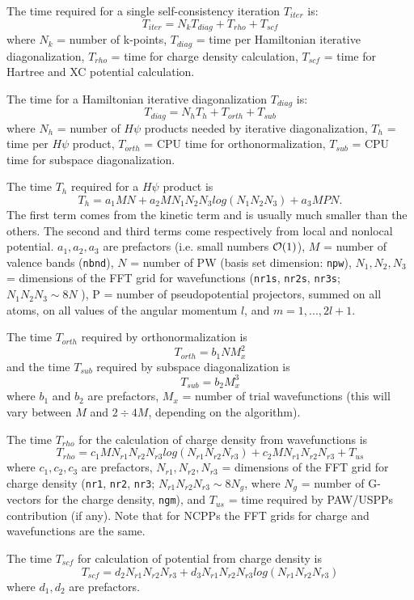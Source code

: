 \documentclass[12pt,a4paper]{article}
\begin{document}
The time required for a single self-consistency iteration $T_{iter}$ is:
$$T_{iter} = N_k T_{diag} +T_{rho} + T_{scf}$$
where $N_k$ = number of k-points, $T_{diag}$ = time per 
Hamiltonian iterative diagonalization, $T_{rho}$ = time for charge density 
calculation, $T_{scf}$ = time for Hartree and XC potential
calculation.
    
The time for a Hamiltonian iterative diagonalization $T_{diag}$ is:
$$T_{diag} = N_h T_h + T_{orth} + T_{sub}$$
where $N_h$ = number of $H\psi$ products needed by iterative diagonalization,
$T_h$ = time per $H\psi$ product, $T_{orth}$ = CPU time for 
orthonormalization, $T_{sub}$ = CPU time for subspace diagonalization.
    
The time $T_h$ required for a $H\psi$ product is
$$T_h = a_1 M N + a_2 M N_1 N_2 N_3 log(N_1 N_2 N_3 ) + a_3 M P N. $$
The first term comes from the kinetic term and is usually much smaller
than the others. The second and third terms come respectively from local
and nonlocal potential. $a_1, a_2, a_3$ are prefactors (i.e.
small numbers ${\cal O}(1)$), $M$ = number of valence
bands (\texttt{nbnd}), $N$ = number of PW (basis set dimension: \texttt{npw}), $N_1, N_2, N_3$ =
dimensions of the FFT grid for wavefunctions (\texttt{nr1s}, \texttt{nr2s},
\texttt{nr3s}; $N_1 N_2 N_3 \sim 8N$ ), 
P = number of pseudopotential projectors, summed on all atoms, on all values of the
angular momentum $l$, and $m = 1, . . . , 2l + 1$.

The time $T_{orth}$ required by orthonormalization is
$$T_{orth} = b_1 N M_x^2$$ 
and the time $T_{sub}$ required by subspace diagonalization is
$$T_{sub} = b_2 M_x^3$$
where $b_1$ and $b_2$ are prefactors, $M_x$ = number of trial wavefunctions 
(this will vary between $M$ and $2\div4 M$, depending on the algorithm).
    
The time $T_{rho}$ for the calculation of charge density from wavefunctions is
$$T_{rho} = c_1 M N_{r1} N_{r2}N_{r3} log(N_{r1} N_{r2} N_{r3}) + 
            c_2 M N_{r1} N_{r2} N_{r3} + T_{us}$$
where $c_1, c_2, c_3$ are prefactors, $N_{r1}, N_{r2}, N_{r3}$ =
dimensions of the FFT grid for charge density (\texttt{nr1},
\texttt{nr2}, \texttt{nr3}; $N_{r1} N_{r2} N_{r3} \sim 8N_g$,
where $N_g$ = number of G-vectors for the charge density,
\texttt{ngm}), and 
$T_{us}$ = time required by PAW/USPPs contribution (if any).
Note that for NCPPs the FFT grids for charge and
wavefunctions are the same.
 
The time $T_{scf}$ for calculation of potential from charge density is
$$T_{scf} = d_2 N_{r1} N_{r2} N_{r3} + d_3 N_{r1} N_{r2} N_{r3} 
            log(N_{r1} N_{r2} N_{r3} )$$
where $d_1, d_2$ are prefactors.
\end{document}
